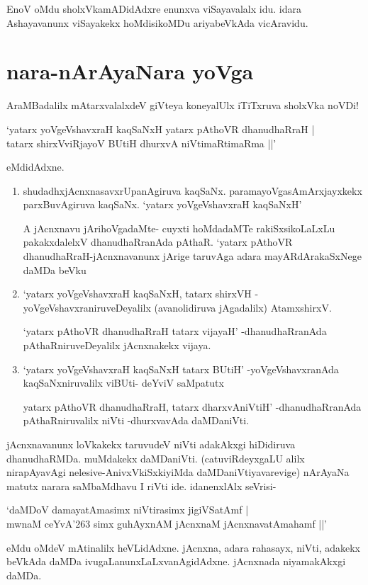 EnoV oMdu sholxVkamADidAdxre enunxva viSayavalalx idu. idara Ashayavanunx viSayakekx hoMdisikoMDu ariyabeVkAda vicAravidu.

\section*{nara-nArAyaNara yoVga}
 
AraMBadalilx mAtarxvalalxdeV giVteya koneyalUlx iTiTxruva sholxVka noVDi!

\begin{shloka}
`yatarx yoVgeVshavxraH kaqSaNxH yatarx pAthoVR dhanudhaRraH |\label{92a}\\
tatarx shirxVviRjayoV BUtiH dhurxvA niVtimaRtimaRma ||' 
\end{shloka}
eMdidAdxne.

\begin{enumerate}
\item shudadhxjAcnxnasavxrUpanAgiruva kaqSaNx. paramayoVgasAmArxjayxkekx parxBuvAgiruva kaqSaNx. `yatarx yoVgeVshavxraH kaqSaNxH'

A jAcnxnavu jArihoVgadaMte- cuyxti hoMdadaMTe rakiSxsikoLaLxLu pakakxdalelxV dhanudhaRranAda pAthaR. `yatarx pAthoVR dhanudhaRraH-jAcnxnavanunx jArige taruvAga adara mayARdArakaSxNege daMDa beVku
\item `yatarx yoVgeVshavxraH kaqSaNxH, tatarx shirxVH -yoVgeVshavxraniruveDeyalilx (avanolidiruva jAgadalilx) AtamxshirxV.

`yatarx pAthoVR dhanudhaRraH tatarx vijayaH' -dhanudhaRranAda pAthaRniruveDeyalilx jAcnxnakekx vijaya.
\item `yatarx yoVgeVshavxraH kaqSaNxH tatarx BUtiH' -yoVgeVshavxranAda kaqSaNxniruvalilx viBUti- deYviV saMpatutx

yatarx pAthoVR dhanudhaRraH, tatarx dharxvAniVtiH' -dhanudhaRranAda pAthaRniruvalilx niVti -dhurxvavAda daMDaniVti.
\end{enumerate}

jAcnxnavanunx loVkakekx taruvudeV niVti adakAkxgi hiDidiruva dhanudhaRMDa. muMdakekx daMDaniVti. (catuviRdeyxgaLU alilx nirapAyavAgi nelesive-AnivxVkiSxkiyiMda daMDaniVtiyavarevige) nArAyaNa matutx narara saMbaMdhavu I riVti ide. idanenxlAlx seVrisi-

\begin{shloka}
`daMDoV damayatAmasimx niVtirasimx jigiVSatAmf |\label{93}\\
mwnaM ceYvA\char'263 simx guhAyxnAM jAcnxnaM jAcnxnavatAmahamf ||'
\end{shloka}
eMdu oMdeV mAtinalilx heVLidAdxne. jAcnxna, adara rahasayx, niVti, adakekx beVkAda daMDa ivugaLanunxLaLxvanAgidAdxne. jAcnxnada niyamakAkxgi daMDa.

